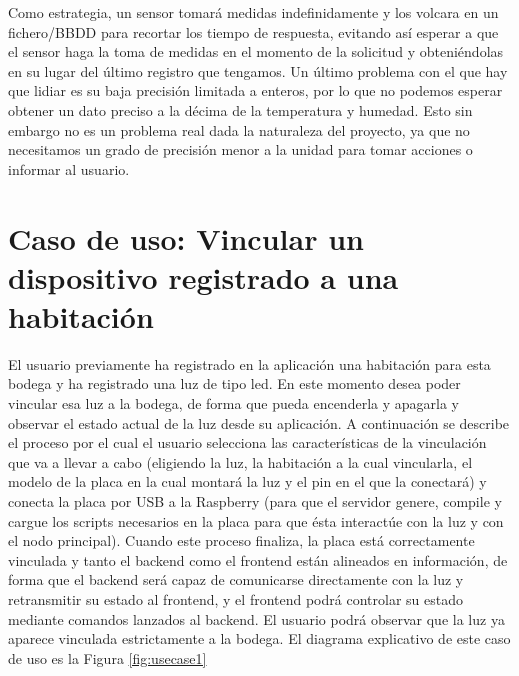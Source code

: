 Como estrategia, un sensor tomará medidas indefinidamente y los volcara en un fichero/BBDD para recortar los tiempo de respuesta, evitando así esperar a que el sensor haga la toma de medidas en el momento de la solicitud y obteniéndolas en su lugar del último registro que tengamos. Un último problema con el que hay que lidiar es su baja precisión limitada a enteros, por lo que no podemos esperar obtener un dato preciso a la décima de la temperatura y humedad. Esto sin embargo no es un problema real dada la naturaleza del proyecto, ya que no necesitamos un grado de precisión menor a la unidad para tomar acciones o informar al usuario.

\section{Caso de uso: Vincular un dispositivo registrado a una habitación}
\label{ch:Capitulo5.2}
El usuario previamente ha registrado en la aplicación una habitación para esta bodega y ha registrado una luz de tipo led. En este momento desea poder vincular esa luz a la bodega, de forma que pueda encenderla y apagarla y observar el estado actual de la luz desde su aplicación. A continuación se describe el proceso por el cual el usuario selecciona las características de la vinculación que va a llevar a cabo (eligiendo la luz, la habitación a la cual vincularla, el modelo de la placa en la cual montará la luz y el pin en el que la conectará) y conecta la placa por USB a la Raspberry (para que el servidor genere, compile y cargue los scripts necesarios en la placa para que ésta interactúe con la luz y con el nodo principal). Cuando este proceso finaliza, la placa está correctamente vinculada y tanto el backend como el frontend están alineados en información, de forma que el backend será capaz de comunicarse directamente con la luz y retransmitir su estado al frontend, y el frontend podrá controlar su estado mediante comandos lanzados al backend. El usuario podrá observar que la luz ya aparece vinculada estrictamente a la bodega.
El diagrama explicativo de este caso de uso es la Figura \ref{fig:usecase1}

